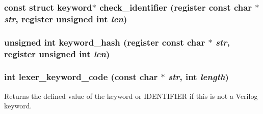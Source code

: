 \subsubsection{\setlength{\rightskip}{0pt plus 5cm}const struct {\bf keyword}$\ast$ check\_\-identifier (register const char $\ast$ {\em str}, register unsigned int {\em len})}\label{keywords_8c_a6}


\subsubsection{\setlength{\rightskip}{0pt plus 5cm}unsigned int keyword\_\-hash (register const char $\ast$ {\em str}, register unsigned int {\em len})\hspace{0.3cm}{\tt  [static]}}\label{keywords_8c_a5}


\subsubsection{\setlength{\rightskip}{0pt plus 5cm}int lexer\_\-keyword\_\-code (const char $\ast$ {\em str}, int {\em length})}\label{keywords_8c_a7}


Returns the defined value of the keyword or IDENTIFIER if this is not a Verilog keyword.

